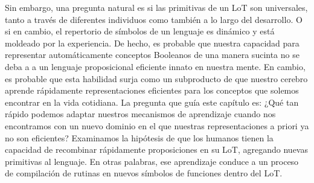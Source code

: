
Sin embargo, una pregunta natural es si las primitivas de un LoT son universales, tanto a través de diferentes individuos como también a lo largo del desarrollo. O si en cambio, el repertorio de símbolos de un lenguaje es dinámico y está moldeado por la experiencia. De hecho, es probable que nuestra capacidad para representar automáticamente conceptos Booleanos de una manera sucinta no se deba a a un lenguaje proposicional eficiente innato en nuestra mente. En cambio, es probable que esta habilidad surja como un subproducto de que nuestro cerebro aprende rápidamente representaciones eficientes para los conceptos que solemos encontrar en la vida cotidiana. La pregunta que guía este capítulo es: ¿Qué tan rápido podemos adaptar nuestros mecanismos de aprendizaje cuando nos encontramos con un nuevo dominio en el que nuestras representaciones a priori ya no son eficientes? Examinamos la hipótesis de que los humanos tienen la capacidad de recombinar rápidamente proposiciones en su LoT, agregando nuevas primitivas al lenguaje. En otras palabras, ese aprendizaje conduce a un proceso de compilación de rutinas en nuevos símbolos de funciones dentro del LoT.


